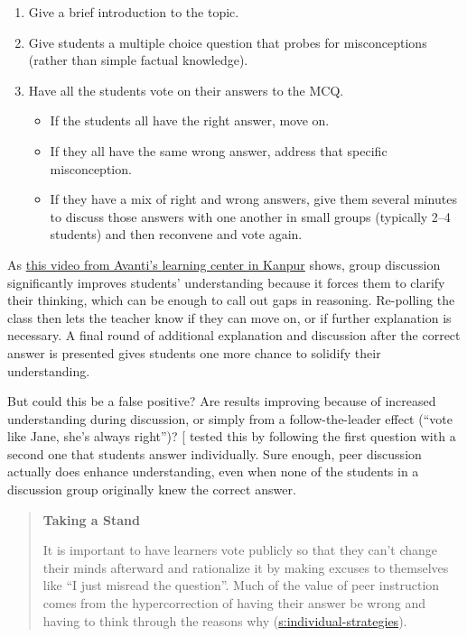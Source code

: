 \begin{enumerate}
\item
  Give a brief introduction to the topic.
\item
  Give students a multiple choice question that probes for
  misconceptions (rather than simple factual knowledge).
\item
  Have all the students vote on their answers to the MCQ.

  \begin{itemize}
  \item
    If the students all have the right answer, move on.
  \item
    If they all have the same wrong answer, address that specific
    misconception.
  \item
    If they have a mix of right and wrong answers, give them several
    minutes to discuss those answers with one another in small
    groups (typically 2--4 students) and then reconvene and vote
    again.
  \end{itemize}
\end{enumerate}

As \href{https://www.youtube.com/watch?v=2LbuoxAy56o}{this video from Avanti's learning center in
Kanpur} shows, group discussion significantly
improves students' understanding because it forces them to clarify
their thinking, which can be enough to call out gaps in
reasoning. Re-polling the class then lets the teacher know if they can
move on, or if further explanation is necessary. A final round of
additional explanation and discussion after the correct answer is
presented gives students one more chance to solidify their
understanding.

But could this be a false positive? Are results improving because of
increased understanding during discussion, or simply from a
follow-the-leader effect (``vote like Jane, she's always right'')?
{[}\protect[\hyperlink{b:Smit2009}{Smit2009}]{]} tested this by following the first question with a
second one that students answer individually. Sure enough, peer
discussion actually does enhance understanding, even when none of the
students in a discussion group originally knew the correct answer.

\begin{quote}\setlength{\parindent}{0pt}
\textbf{Taking a Stand}

It is important to have learners vote publicly so that they can't
change their minds afterward and rationalize it by making excuses to
themselves like ``I just misread the question''. Much of the value of
peer instruction comes from the hypercorrection of having their answer
be wrong and having to think through the reasons why
(\protect\hyperlink{SECTION}{s:individual-strategies}).
\end{quote}

